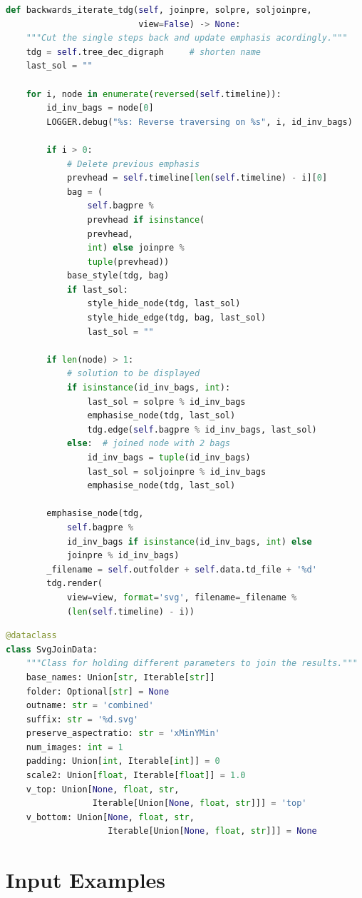 \documentclass[a4paper, 12pt]{scrartcl}
\begin{document}
\begin{lstlisting}[language={Python}, caption={backwards\_iterate\_tdg}, label={lst:backward-iterate}]
def backwards_iterate_tdg(self, joinpre, solpre, soljoinpre,
                          view=False) -> None:
	"""Cut the single steps back and update emphasis acordingly."""
	tdg = self.tree_dec_digraph     # shorten name
	last_sol = ""
	
	for i, node in enumerate(reversed(self.timeline)):
		id_inv_bags = node[0]
		LOGGER.debug("%s: Reverse traversing on %s", i, id_inv_bags)
		
		if i > 0:
			# Delete previous emphasis
			prevhead = self.timeline[len(self.timeline) - i][0]
			bag = (
				self.bagpre %
				prevhead if isinstance(
				prevhead,
				int) else joinpre %
				tuple(prevhead))
			base_style(tdg, bag)
			if last_sol:
				style_hide_node(tdg, last_sol)
				style_hide_edge(tdg, bag, last_sol)
				last_sol = ""
		
		if len(node) > 1:
			# solution to be displayed
			if isinstance(id_inv_bags, int):
				last_sol = solpre % id_inv_bags
				emphasise_node(tdg, last_sol)
				tdg.edge(self.bagpre % id_inv_bags, last_sol)
			else:  # joined node with 2 bags
				id_inv_bags = tuple(id_inv_bags)
				last_sol = soljoinpre % id_inv_bags
				emphasise_node(tdg, last_sol)
			
		emphasise_node(tdg,
			self.bagpre %
			id_inv_bags if isinstance(id_inv_bags, int) else 
			joinpre % id_inv_bags)
		_filename = self.outfolder + self.data.td_file + '%d'
		tdg.render(
			view=view, format='svg', filename=_filename %
			(len(self.timeline) - i))

\end{lstlisting}

\begin{lstlisting}[language={Python}, caption={SvgJoinData}, label={lst:svgjoindata}]
@dataclass
class SvgJoinData:
	"""Class for holding different parameters to join the results."""
	base_names: Union[str, Iterable[str]]
	folder: Optional[str] = None
	outname: str = 'combined'
	suffix: str = '%d.svg'
	preserve_aspectratio: str = 'xMinYMin'
	num_images: int = 1
	padding: Union[int, Iterable[int]] = 0
	scale2: Union[float, Iterable[float]] = 1.0
	v_top: Union[None, float, str, 
	             Iterable[Union[None, float, str]]] = 'top'
	v_bottom: Union[None, float, str, 
	                Iterable[Union[None, float, str]]] = None
\end{lstlisting}
\section{Input Examples}
\end{document}

